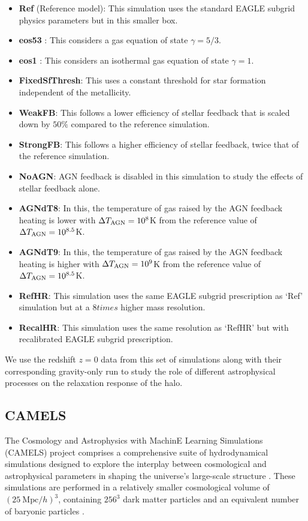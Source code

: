 \begin{itemize}
    \item \textbf{Ref} (Reference model): This simulation uses the standard EAGLE subgrid physics parameters but in this smaller box.
    \item \textbf{eos53} : This considers a gas equation of state $\gamma = 5/3$.
    \item \textbf{eos1} : This considers an isothermal gas equation of state $\gamma = 1$.
    \item \textbf{FixedSfThresh}: This uses a constant threshold for star formation independent of the metallicity.
    \item \textbf{WeakFB}: This follows a lower efficiency of stellar feedback that is scaled down by $50 \%$ compared to the reference simulation.
    \item \textbf{StrongFB}: This follows a higher efficiency of stellar feedback, twice that of the reference simulation.
    \item \textbf{NoAGN}: AGN feedback is disabled in this simulation to study the effects of stellar feedback alone.
    \item \textbf{AGNdT8}: In this, the temperature of gas raised by the AGN feedback heating is  lower with $\Delta T_{\rm{AGN}} = 10^8$K from the reference value of $\Delta T_{\rm{AGN}} = 10^{8.5}$K.
    \item \textbf{AGNdT9}: In this, the temperature of gas raised by the AGN feedback heating is higher with $\Delta T_{\rm{AGN}} = 10^9$K from the reference value of $\Delta T_{\rm{AGN}} = 10^{8.5}$K.
    \item \textbf{RefHR}: This simulation uses the same EAGLE subgrid prescription as `Ref' simulation but at a $8 times$ higher mass resolution.
    \item \textbf{RecalHR}: This simulation uses the same resolution as `RefHR' but with recalibrated EAGLE subgrid prescription.
\end{itemize}
We use the redshift $z=0$ data from this set of simulations along with their corresponding gravity-only run to study the role of different astrophysical processes on the relaxation response of the halo.



\subsection{CAMELS}
\label{sec:sims-CAMELS}
The Cosmology and Astrophysics with MachinE Learning Simulations (CAMELS) project comprises a comprehensive suite of hydrodynamical simulations designed to explore the interplay between cosmological and astrophysical parameters in shaping the universe's large-scale structure \cite[][]{CAMELS_presentation}. These simulations are performed in a relatively smaller cosmological volume of $(25 \ \mathrm{Mpc}/h)^3$, containing $256^3$ dark matter particles and an equivalent number of baryonic particles \cite{CAMELS_DR1}.


